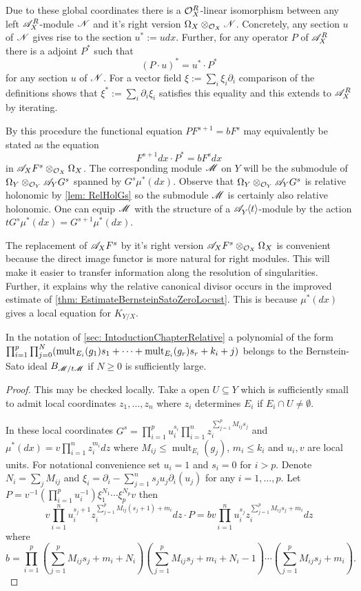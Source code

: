 Due to these global coordinates there is a $\mathcal{O}_X^R$-linear isomorphism between any left $\mathscr{A}_X^R$-module $\mathscr{N}$ and it's right version $\Omega_X \otimes_{\mathcal{O}_X}\mathscr{N}$. Concretely, any section $u$ of $\mathscr{N}$ gives rise to the section $u^* := u dx$. Further, for any operator $P$ of $\mathscr{A}_X^R$ there is a adjoint $P^*$ such that
$$(P\cdot u)^* =   u^* \cdot P^*$$
for any section $u$ of $\mathscr{N}$. For a vector field $\xi := \sum_i\xi_i \partial_i$ comparison of the definitions shows that $\xi^* := \sum_i\partial_i\xi_i$ satisfies this equality and this extends to $\mathscr{A}_X^R$ by iterating.

By this procedure the functional equation $P F^{s+1} = b F^s$ may equivalently be stated as the equation
$$F^{s+1}dx \cdot P^* = b F^s dx $$
in $\mathscr{A}_X F^s \otimes_{\mathcal{O}_X}\Omega_X$.
The corresponding module $\mathscr{M}$ on $Y$ will be the submodule of $\Omega_Y\otimes_{\mathcal{O}_Y} \mathscr{A}_Y G^s$ spanned by $G^s \mu^*(dx)$.
Observe that $\Omega_Y\otimes_{\mathcal{O}_Y} \mathscr{A}_Y G^s$ is relative holonomic by \cref{lem: RelHolGs} so the submodule $\mathscr{M}$ is certainly also relative holonomic.
One can equip $\mathscr{M}$ with the structure of a $\mathscr{A}_{Y}^{}\mkern-5mu\left\langle t \right\rangle$-module by the action $t G^s \mu^*(dx) = G^{s+1} \mu^*(dx)$.

The replacement of $\mathscr{A}_XF^s$ by it's right version $\mathscr{A}_XF^s \otimes_{\mathcal{O}_X}\Omega_X$ is convenient because the direct image functor is more natural for right modules.
This will make it easier to transfer information along the resolution of singularities.
Further, it explains why the relative canonical divisor occurs in the improved estimate of \cref{thm: EstimateBernsteinSatoZeroLocust}.
This is because $\mu^*(dx)$ gives a local equation for $K_{Y/X}$.
\begin{lemma}\label{lem: BernsteinSatoPolynomialUpstairs}
  In the notation of \cref{sec: IntoductionChapterRelative} a polynomial of the form
  $\prod_{i=1}^p \prod_{j=0}^N(\operatorname{mult}_{E_i}(g_1)\allowbreak s_1 + \cdots + \operatorname{mult}_{E_i}(g_r)\allowbreak s_r + k_i + j)$
  belongs to the Bernstein-Sato ideal $B_{\mathscr{M}/t\mathscr{M}}$ if $N\geq 0$ is sufficiently large.
\end{lemma}
\begin{proof}
  This may be checked locally.
  Take a open $U\subseteq Y$ which is sufficiently small to admit local coordinates $z_1,\ldots,z_n$ where $z_i$ determines $E_i$ if $E_i\cap U \neq \emptyset$.

  In these local coordinates $G^s = \prod_{i=1}^p u_i^{s_i} \prod_{i=1}^nz_i^{\sum_{j=1}^p M_{ij}s_j}$ and $\mu^*(dx) = v \prod_{i=1}^n z_i^{m_i} dz$ where $M_{ij} \leq \operatorname{mult}_{E_i}(g_j)$, $m_i \leq k_i$ and $u_i,v$ are local units.
  For notational convenience set $u_i=1$ and $s_i=0$ for $i>p$.
  Denote $N_i = \sum_j M_{ij}$ and $\xi_i = \partial_i - \sum_{j=1}^n s_ju_j \partial_i(u_j)$ for any $i=1,\ldots,p$.
  Let $P = v^{-1}(\prod_{i=1}^p u_i^{-1})\xi_1^{N_1} \cdots \xi_p^{N_p} v$ then
  $$v\prod_{i=1}^n u_i^{s_j + 1}z_i^{\sum_{j=1}^p M_{ij}(s_j+1) + m_i}dz \cdot P =  b v \prod_{i=1}^nu_i^{s_j}z_i^{\sum_{j=1}^p M_{ij}s_j + m_i}dz $$
  where
  $$b = \prod_{i=1}^p(\sum_{j=1}^p M_{ij}s_j + m_i + N_i)(\sum_{j=1}^p M_{ij}s_j + m_i + N_i - 1)\cdots(\sum_{j=1}^p M_{ij}s_j + m_i).$$
\end{proof}


